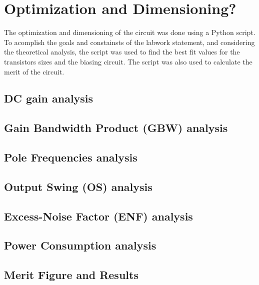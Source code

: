 \section{Optimization and Dimensioning?}

The optimization and dimensioning of the circuit was done using a Python script. To acomplish the goals and constainsts of the labwork statement, and considering the theoretical analysis, the script was used to find the best fit values for the transistors sizes and the biasing circuit. The script was also used to calculate the merit of the circuit.

\subsection{DC gain analysis}

\subsection{Gain Bandwidth Product (GBW) analysis}

\subsection{Pole Frequencies analysis}

\subsection{Output Swing (OS) analysis}

\subsection{Excess-Noise Factor (ENF) analysis}

\subsection{Power Consumption analysis}

\subsection{Merit Figure and Results}
